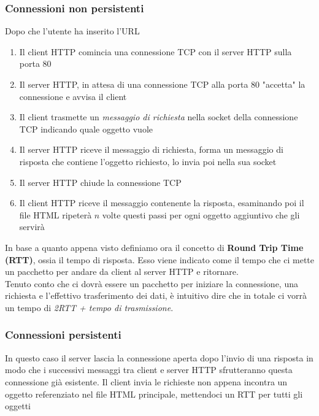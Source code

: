 \documentclass{article}
\begin{document}
            \subsubsection{Connessioni non persistenti}
                Dopo che l'utente ha inserito l'URL
                \begin{enumerate}
                    \item Il client HTTP comincia una connessione TCP con il server HTTP sulla porta 80
                    \item Il server HTTP, in attesa di una connessione TCP alla porta 80 "accetta" la connessione e avvisa il client
                    \item Il client trasmette un \textit{messaggio di richiesta} nella socket della connessione TCP indicando quale oggetto vuole
                    \item Il server HTTP riceve il messaggio di richiesta, forma un messaggio di risposta che contiene l'oggetto richiesto, lo invia poi nella sua socket
                    \item Il server HTTP chiude la connessione TCP
                    \item Il client HTTP riceve il messaggio contenente la risposta, esaminando poi il file HTML ripeterà $ n $ volte questi passi per ogni oggetto aggiuntivo che gli servirà
                \end{enumerate}
                In base a quanto appena visto definiamo ora il concetto di \textbf{Round Trip Time (RTT)}, ossia il tempo di risposta. Esso viene indicato come il tempo che ci mette un pacchetto per andare da client al server HTTP e ritornare.\\
                Tenuto conto che ci dovrà essere un pacchetto per iniziare la connessione, una richiesta e l'effettivo trasferimento dei dati, è intuitivo dire che in totale ci vorrà un tempo di \textit{2RTT + tempo di trasmissione}.

            \subsubsection{Connessioni persistenti}
                In questo caso il server lascia la connessione aperta dopo l'invio di una risposta in modo che i successivi messaggi tra client e server HTTP sfrutteranno questa connessione già esistente. Il client invia le richieste non appena incontra un oggetto referenziato nel file HTML principale, mettendoci un RTT per tutti gli oggetti
\end{document}
